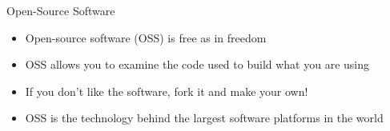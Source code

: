 \documentclass[10pt]{beamer}
\begin{document}
\begin{frame}[t]{Open-Source Software}
  \begin{itemize}
    \item Open-source software (OSS) is free as in freedom
    \item OSS allows you to examine the code used to build what you are using
    \item If you don't like the software, fork it and make your own!
    \item OSS is the technology behind the largest software platforms in the
      world
  \end{itemize}
\end{frame}
\end{document}
